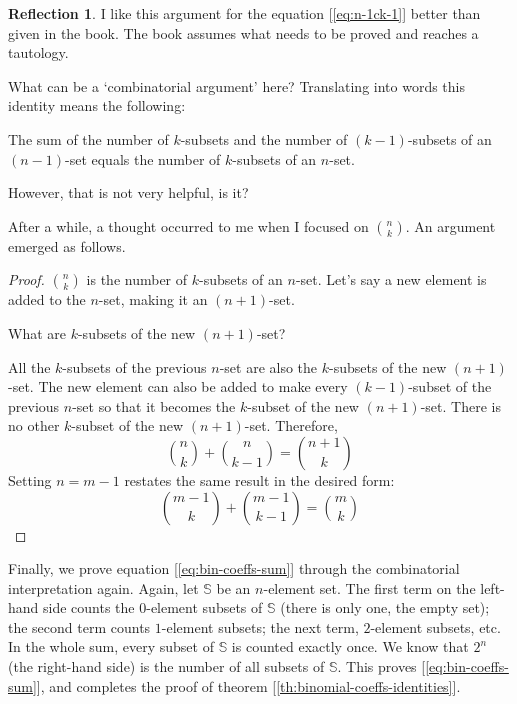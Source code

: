 \documentclass[11pt]{book}
\theoremstyle{definition}
\theoremstyle{plain}
\theoremstyle{definition}
\theoremstyle{problemstyle}
\theoremstyle{remark}
\theoremstyle{definition}
\newtheorem{reflection}{Reflection}
\begin{document}
    \begin{reflection}
        \label{ref:n-1ck-1}
        I like this argument for the equation [\ref{eq:n-1ck-1}] better than given in the book. The book assumes what needs to be proved and reaches a tautology.

        What can be a `combinatorial argument' here? Translating into words this identity means the following:
        \begin{leftbar}
            The sum of the number of $k$-subsets and the number of $(k-1)$-subsets of an $(n-1)$-set equals the number of $k$-subsets of an $n$-set.
        \end{leftbar}

        However, that is not very helpful, is it?

        After a while, a thought occurred to me when I focused on $\binom{n}{k}$. An argument emerged as follows.
        \begin{proof}
            $\binom{n}{k}$ is the number of $k$-subsets of an $n$-set. Let's say a new element is added to the $n$-set, making it an $(n+1)$-set. 

        What are $k$-subsets of the new $(n+1)$-set?

        All the $k$-subsets of the previous $n$-set are also the $k$-subsets of the new $(n+1)$-set. The new element can also be added to make every $(k-1)$-subset of the previous $n$-set so that it becomes the $k$-subset of the new $(n+1)$-set. There is no other $k$-subset of the new $(n+1)$-set. Therefore,
        \[
            \binom{n}{k}+\binom{n}{k-1}=\binom{n+1}{k}
        \]
        Setting $n=m-1$ restates the same result in the desired form:
            \[
                \binom{m-1}{k}+\binom{m-1}{k-1}=\binom{m}{k}
            \]
        \end{proof}
    \end{reflection}
Finally, we prove equation [\ref{eq:bin-coeffs-sum}] through the combinatorial interpretation again.  Again, let $\mathbb{S}$ be an $n$-element set. The first term on the left-hand side counts the $0$-element subsets of $\mathbb{S}$ (there is only one, the empty set); the second term counts $1$-element subsets; the next term, $2$-element subsets, etc. In the whole sum, every subset of $\mathbb{S}$ is counted exactly once. We know that $2^n$ (the right-hand side) is the number of all subsets of $\mathbb{S}$. This proves [\ref{eq:bin-coeffs-sum}], and completes the proof of theorem [\ref{th:binomial-coeffs-identities}].
\end{document}
